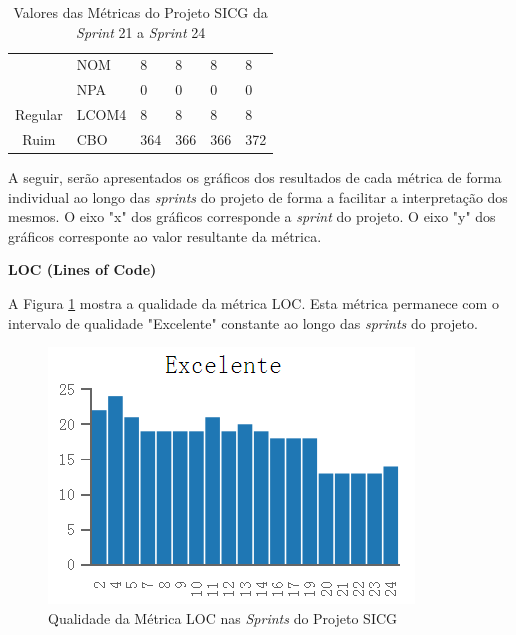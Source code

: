 \begin{table}[H]
\begin{tabular}{|c|l|l|l|l|l|}
                                                   & NOM              & 8                  & 8                  & 8                  & 8                  \\ \cline{2-6} 
                                                   & NPA              & 0                  & 0                  & 0                  & 0                  \\ \hline
Regular                                            & LCOM4            & 8                  & 8                  & 8                  & 8                  \\ \hline
Ruim                                               & CBO              & 364                & 366                & 366                & 372                \\ \hline
\end{tabular}
\caption{Valores das Métricas do Projeto SICG da \textit{Sprint} 21 a \textit{Sprint} 24}
		\label{metricasprint4}
\end{table}


A seguir, serão apresentados os gráficos dos resultados de cada métrica de forma individual ao longo das \textit{sprints} do projeto de forma a facilitar a interpretação dos mesmos. O eixo "x" dos gráficos corresponde a \textit{sprint} do projeto. O eixo "y" dos gráficos corresponte ao valor resultante da métrica.

\textbf{LOC (Lines of Code)}

A Figura \ref{loc} mostra a qualidade da métrica LOC. Esta métrica permanece com o intervalo de qualidade "Excelente" constante ao longo das \textit{sprints} do projeto.

\begin{figure}[H]
		\centering
			\includegraphics[scale=1.0]{figuras/loc.png}
		\caption{Qualidade da Métrica LOC nas \textit{Sprints} do Projeto SICG}
		\label{loc}
\end{figure}

